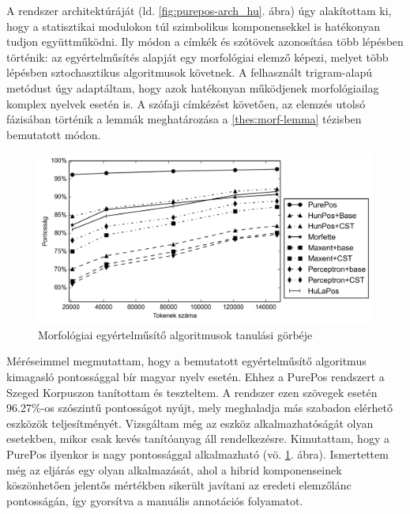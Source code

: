 A rendszer architektúráját  (ld. \ref{fig:purepos-arch_hu}. ábra) úgy alakítottam ki, hogy a statisztikai modulokon túl szimbolikus komponensekkel is hatékonyan tudjon együttműködni. 
Ily módon a címkék és szótövek azonosítása több lépésben történik:
az egyértelműsítés alapját egy morfológiai elemző képezi, melyet több lépésben sztochasztikus algoritmusok követnek. 
A felhasznált trigram-alapú metódust úgy adaptáltam, hogy azok hatékonyan működjenek morfológiailag komplex nyelvek esetén is.
A szófaji címkézést követően, az elemzés utolsó fázisában történik a lemmák meghatározása a \ref{thes:morf-lemma} tézisben bemutatott módon.

\begin{figure} %
  \centering
  \includegraphics[width=1\textwidth]{MorphTagging/humor_token_hu.png}
  \caption{Morfológiai egyértelműsítő algoritmusok tanulási görbéje}
  \label{fig:humor-token_hu}
\end{figure}

Méréseimmel megmutattam, hogy a bemutatott egyértelműsítő algoritmus kimagasló pontossággal bír magyar nyelv esetén. 
Ehhez a PurePos rendszert a Szeged Korpuszon tanítottam és teszteltem. 
A rendszer ezen szövegek esetén 96.27\%-os szószintű pontosságot nyújt, mely meghaladja más szabadon elérhető eszközök teljesítményét.
Vizsgáltam még az eszköz alkalmazhatóságát olyan esetekben, mikor csak kevés tanítóanyag áll rendelkezésre.
Kimutattam, hogy a PurePos ilyenkor is nagy pontossággal alkalmazható (vö. \ref{fig:humor-token_hu}. ábra). 
Ismertettem még az eljárás egy olyan alkalmazását, ahol a hibrid komponenseinek köszönhetően jelentős mértékben sikerült javítani az eredeti elemzőlánc pontosságán, így gyorsítva a manuális annotációs folyamatot.


